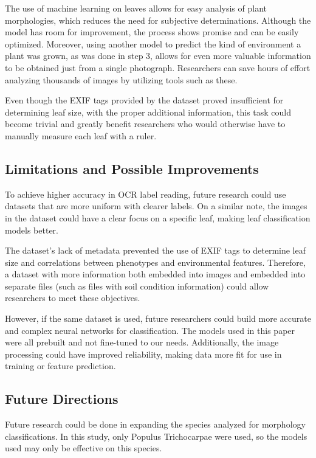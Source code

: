 \documentclass[final,5p,times,twocolumn,authoryear]{elsarticle}
\begin{document}
The use of machine learning on leaves allows for easy analysis of plant morphologies, which reduces the need for subjective determinations. Although the model has room for improvement, the process shows promise and can be easily optimized. Moreover, using another model to predict the kind of environment a plant was grown, as was done in step 3, allows for even more valuable information to be obtained just from a single photograph. Researchers can save hours of effort analyzing thousands of images by utilizing tools such as these.

Even though the EXIF tags provided by the dataset proved insufficient for determining leaf size, with the proper additional information, this task could become trivial and greatly benefit researchers who would otherwise have to manually measure each leaf with a ruler.

\subsection{Limitations and Possible Improvements}

To achieve higher accuracy in OCR label reading, future research could use datasets that are more uniform with clearer labels. On a similar note, the images in the dataset could have a clear focus on a specific leaf, making leaf classification models better.

The dataset's lack of metadata prevented the use of EXIF tags to determine leaf size and correlations between phenotypes and environmental features. Therefore, a dataset with more information both embedded into images and embedded into separate files (such as files with soil condition information) could allow researchers to meet these objectives.

However, if the same dataset is used, future researchers could build more accurate and complex neural networks for classification. The models used in this paper were all prebuilt and not fine-tuned to our needs. Additionally, the image processing could have improved reliability, making data more fit for use in training or feature prediction.

\subsection{Future Directions}

Future research could be done in expanding the species analyzed for morphology classifications. In this study, only Populus Trichocarpae were used, so the models used may only be effective on this species.
\end{document}
